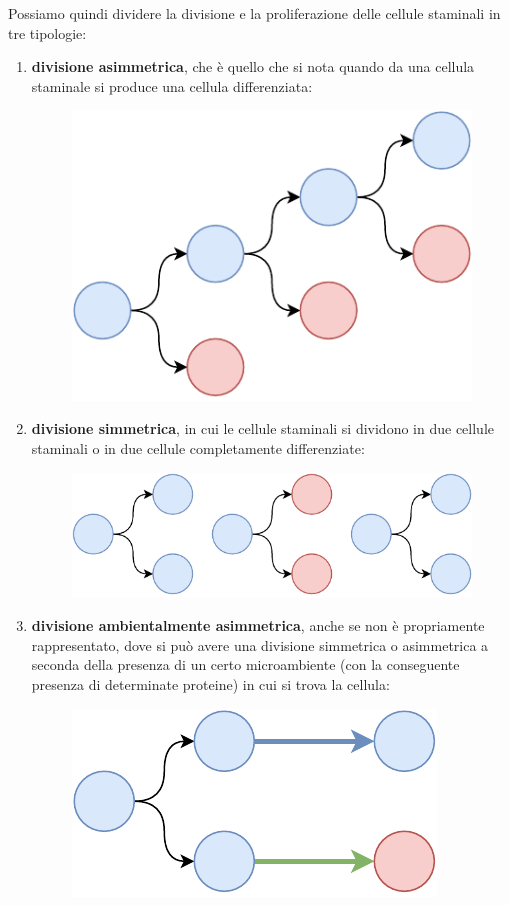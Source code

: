 \documentclass[a4paper,12pt, oneside]{book}
\begin{document}
\newpage
Possiamo quindi dividere la divisione e la proliferazione delle cellule
staminali in tre tipologie:
\begin{enumerate}
  \item \textbf{divisione asimmetrica}, che è quello che si nota quando da una
  cellula staminale si produce una cellula differenziata:
  \begin{figure}[H]
    \centering
    \includegraphics[scale = 0.8]{img/asim.pdf}
  \end{figure}
  \item \textbf{divisione simmetrica}, in cui le cellule staminali si dividono
  in due cellule staminali o in due cellule completamente differenziate:
  \begin{figure}[H]
    \centering
    \includegraphics[scale = 0.8]{img/sim.pdf}
  \end{figure}
  \item \textbf{divisione ambientalmente asimmetrica}, anche se non è
  propriamente rappresentato, dove si può avere una divisione simmetrica o
  asimmetrica a seconda della presenza di un certo microambiente (con la
  conseguente presenza di determinate proteine) in cui si trova
  la cellula: 
  \begin{figure}[H]
    \centering
    \includegraphics[scale = 0.8]{img/aasim.pdf}
  \end{figure}
\end{enumerate}
\end{document}
